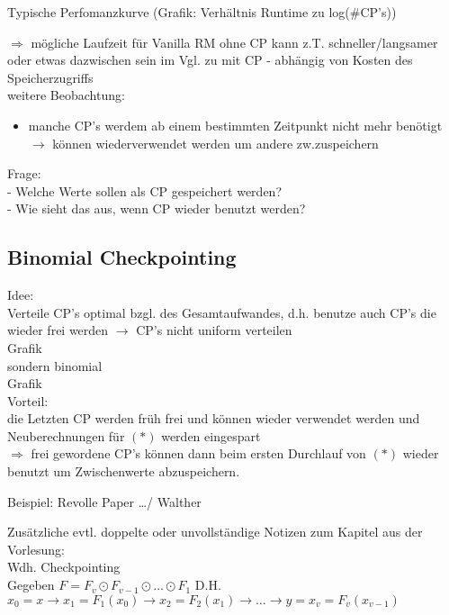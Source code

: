Typische Perfomanzkurve (Grafik: Verhältnis Runtime zu log(#CP's))\\
\vspace{3cm}

$\Rightarrow$ mögliche Laufzeit für Vanilla RM ohne CP kann z.T. schneller/langsamer oder etwas dazwischen sein im Vgl. zu mit CP - abhängig von Kosten des Speicherzugriffs\\

\noindent weitere Beobachtung:
\begin{itemize}
	\item manche CP's werdem ab einem bestimmten Zeitpunkt nicht mehr benötigt $\rightarrow$ können wiederverwendet werden um andere zw.zuspeichern
\end{itemize}
Frage:\\
- Welche Werte sollen als CP gespeichert werden?\\
- Wie sieht das aus, wenn CP wieder benutzt werden?

\subsection{Binomial Checkpointing}
Idee:\\
Verteile CP's optimal bzgl. des Gesamtaufwandes, d.h. benutze auch CP's die wieder frei werden
$\rightarrow$ CP's nicht uniform verteilen\\
Grafik\\
sondern binomial\\
Grafik\\

Vorteil:\\
die Letzten CP werden früh frei und können wieder verwendet werden und Neuberechnungen für $(*)$ werden eingespart\\
$\Rightarrow$ frei gewordene CP's können dann beim ersten Durchlauf von $(*)$ wieder benutzt um Zwischenwerte abzuspeichern.

Beispiel: Revolle Paper \dots / Walther







\noindent\makebox[\linewidth]{\rule{\paperwidth}{0.4pt}}
Zusätzliche evtl. doppelte oder unvollständige Notizen zum Kapitel aus der Vorlesung:\\

Wdh. Checkpointing\\
Gegeben $F = F_v \odot F_{v-1} \odot \dots \odot F_1$ D.H.
$x_0 = x \rightarrow x_1 = F_1(x_0) \rightarrow x_2 = F_2(x_1) \rightarrow \dots \rightarrow y= x_v = F_v(x_{v-1})$

